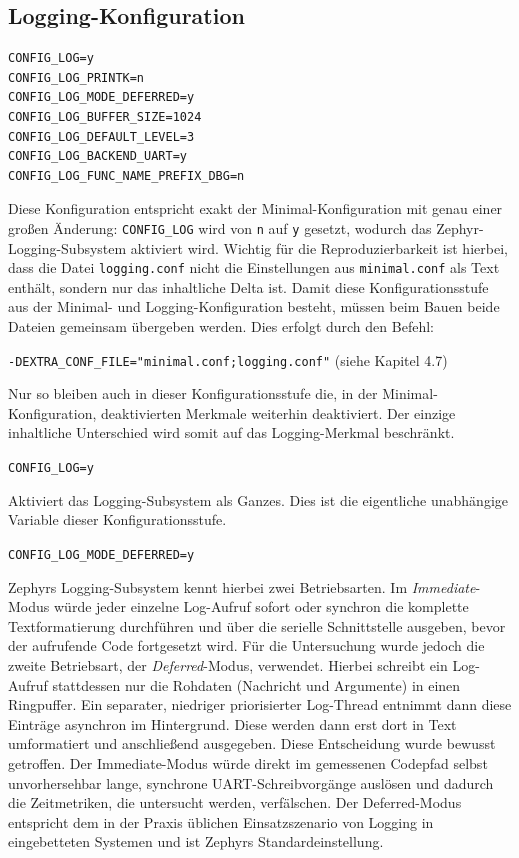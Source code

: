\subsection{Logging-Konfiguration}
\begin{lstlisting}[style=basecode,language=Kconfig]
CONFIG_LOG=y
CONFIG_LOG_PRINTK=n
CONFIG_LOG_MODE_DEFERRED=y
CONFIG_LOG_BUFFER_SIZE=1024
CONFIG_LOG_DEFAULT_LEVEL=3
CONFIG_LOG_BACKEND_UART=y
CONFIG_LOG_FUNC_NAME_PREFIX_DBG=n
\end{lstlisting}
Diese Konfiguration entspricht exakt der Minimal-Konfiguration mit genau einer gro{\ss}en {\"A}nderung: \lstinline[style=fileinline]|CONFIG_LOG| wird von \lstinline[style=fileinline]|n| auf \lstinline[style=fileinline]|y| gesetzt, wodurch das Zephyr-Logging-Subsystem aktiviert wird. Wichtig f{\"u}r die Reproduzierbarkeit ist hierbei, dass die Datei \lstinline[style=fileinline]|logging.conf| nicht die Einstellungen aus \lstinline[style=fileinline]|minimal.conf| als Text enth{\"a}lt, sondern nur das inhaltliche Delta ist. Damit diese Konfigurationsstufe aus der Minimal- und Logging-Konfiguration besteht, m{\"u}ssen beim Bauen beide Dateien gemeinsam {\"u}bergeben werden. Dies erfolgt durch den Befehl:

\lstinline[style=fileinline]|-DEXTRA_CONF_FILE="minimal.conf;logging.conf"| (siehe Kapitel 4.7)

Nur so bleiben auch in dieser Konfigurationsstufe die, in der Minimal-Konfiguration, deaktivierten Merkmale weiterhin deaktiviert. Der einzige inhaltliche Unterschied wird somit auf das Logging-Merkmal beschr{\"a}nkt.

\lstinline[style=fileinline]|CONFIG_LOG=y|

Aktiviert das Logging-Subsystem als Ganzes. Dies ist die eigentliche unabh{\"a}ngige Variable dieser Konfigurationsstufe.

\lstinline[style=fileinline]|CONFIG_LOG_MODE_DEFERRED=y|

Zephyrs Logging-Subsystem kennt hierbei zwei Betriebsarten. Im \emph{Immediate}-Modus w{\"u}rde jeder einzelne Log-Aufruf sofort oder synchron die komplette Textformatierung durchf{\"u}hren und {\"u}ber die serielle Schnittstelle ausgeben, bevor der aufrufende Code fortgesetzt wird. F{\"u}r die Untersuchung wurde jedoch die zweite Betriebsart, der \emph{Deferred}-Modus, verwendet. Hierbei schreibt ein Log-Aufruf stattdessen nur die Rohdaten (Nachricht und Argumente) in einen Ringpuffer. Ein separater, niedriger priorisierter Log-Thread entnimmt dann diese Eintr{\"a}ge asynchron im Hintergrund. Diese werden dann erst dort in Text umformatiert und anschlie{\ss}end ausgegeben. Diese Entscheidung wurde bewusst getroffen. Der Immediate-Modus w{\"u}rde direkt im gemessenen Codepfad selbst unvorhersehbar lange, synchrone UART-Schreibvorg{\"a}nge ausl{\"o}sen und dadurch die Zeitmetriken, die untersucht werden, verf{\"a}lschen. Der Deferred-Modus entspricht dem in der Praxis {\"u}blichen Einsatzszenario von Logging in eingebetteten Systemen und ist Zephyrs Standardeinstellung.

